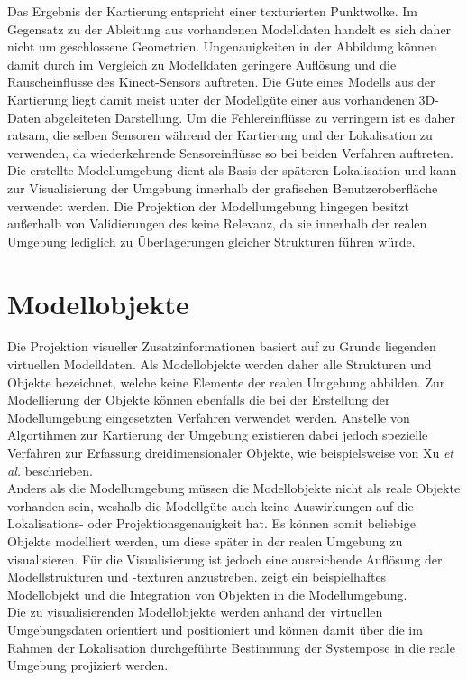 Das Ergebnis der Kartierung entspricht einer texturierten Punktwolke. Im Gegensatz zu der Ableitung aus vorhandenen Modelldaten handelt es sich daher nicht um geschlossene Geometrien. Ungenauigkeiten in der Abbildung können damit durch im Vergleich zu Modelldaten geringere Auflösung und die Rauscheinflüsse des Kinect-Sensors auftreten. Die Güte eines Modells aus der Kartierung liegt damit meist unter der Modellgüte einer aus vorhandenen 3D-Daten abgeleiteten Darstellung. Um die Fehlereinflüsse zu verringern ist es daher ratsam, die selben Sensoren während der Kartierung und der Lokalisation zu verwenden, da wiederkehrende Sensoreinflüsse so bei beiden Verfahren auftreten.\\

Die erstellte Modellumgebung dient als Basis der späteren Lokalisation und kann zur Visualisierung der Umgebung innerhalb der grafischen Benutzeroberfläche verwendet werden. Die Projektion der Modellumgebung hingegen besitzt außerhalb von Validierungen des  keine Relevanz, da sie innerhalb der realen Umgebung lediglich zu Überlagerungen gleicher Strukturen führen würde.\\

\section{Modellobjekte}
Die Projektion visueller Zusatzinformationen basiert auf zu Grunde liegenden virtuellen Modelldaten. Als Modellobjekte werden daher alle Strukturen und Objekte bezeichnet, welche keine Elemente der realen Umgebung abbilden. Zur Modellierung der Objekte können ebenfalls die bei der Erstellung der Modellumgebung eingesetzten Verfahren verwendet werden. Anstelle von Algortihmen zur Kartierung der Umgebung existieren dabei jedoch spezielle Verfahren zur Erfassung dreidimensionaler Objekte, wie beispielsweise von Xu \textit{et al.} \cite{Xu2012} beschrieben.\\

Anders als die Modellumgebung müssen die Modellobjekte nicht als reale Objekte vorhanden sein, weshalb die Modellgüte auch keine Auswirkungen auf die Lokalisations- oder Projektionsgenauigkeit hat. Es können somit beliebige Objekte modelliert werden, um diese später in der realen Umgebung zu visualisieren.  Für die Visualisierung ist jedoch eine ausreichende Auflösung der Modellstrukturen und -texturen anzustreben.  zeigt ein beispielhaftes Modellobjekt und die Integration von Objekten in die Modellumgebung.\\
Die zu visualisierenden Modellobjekte werden anhand der virtuellen Umgebungsdaten orientiert und positioniert und können damit über die im Rahmen der Lokalisation durchgeführte Bestimmung der Systempose in die reale Umgebung projiziert werden.\\

